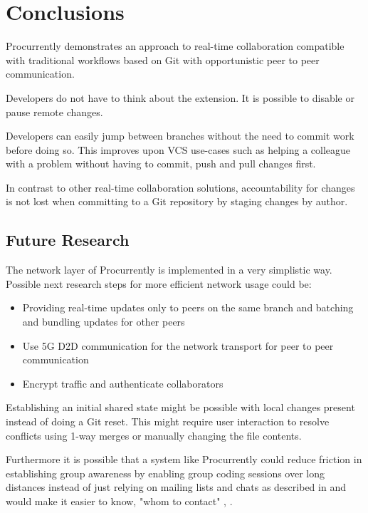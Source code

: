 \chapter{Conclusions}

Procurrently demonstrates an approach to real-time collaboration compatible with traditional workflows based on Git with opportunistic peer to peer communication. 

Developers do not have to think about the extension. It is possible to disable or pause remote changes. 

Developers can easily jump between branches without the need to commit work before doing so. This improves upon VCS use-cases such as helping a colleague with a problem without having to commit, push and pull changes first. 

In contrast to other real-time collaboration solutions, accountability for changes is not lost when committing to a Git repository by staging changes by author.

\section{Future Research}

The network layer of Procurrently is implemented in a very simplistic way.
Possible next research steps for more efficient network usage could be:

\begin{itemize}
    \item Providing real-time updates only to peers on the same branch and batching and bundling updates for other peers
    \item Use 5G D2D communication for the network transport for peer to peer communication \cite{TehraniUysalYanikomeroglu:2014:Device-to-devicecommunicationin5G}
    \item Encrypt traffic and authenticate collaborators
\end{itemize}

Establishing an initial shared state might be possible with local changes present instead of doing a Git reset. This might require user interaction to resolve conflicts using 1-way merges or manually changing the file contents. \cite{7070484}

Furthermore it is possible that a system like Procurrently could reduce friction in establishing group awareness by enabling group coding sessions over long distances instead of just relying on mailing lists and chats as described in \cite{Gutwin:2004:GAD:1031607.1031621} and would make it easier to know, "whom to contact" \cite{795103}, \cite{Gutwin:2004:GAD:1031607.1031621}.

